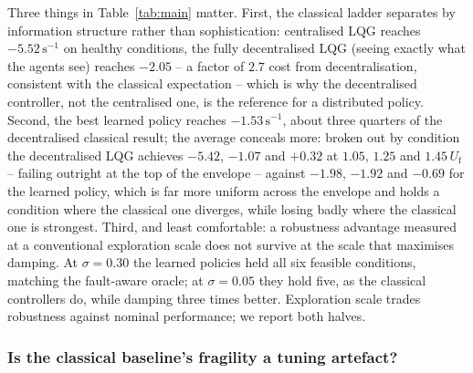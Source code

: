 \documentclass[journal]{new-aiaa}
\newcommand{\Uf}{U_{\mathrm{f}}}
\begin{document}
Three things in Table~\ref{tab:main} matter. First, the classical ladder
separates by information structure rather than sophistication: centralised
LQG reaches $-5.52\,\mathrm{s}^{-1}$ on healthy conditions, the fully
decentralised LQG (seeing exactly what the agents see) reaches $-2.05$ -- a
factor of $2.7$ cost from decentralisation, consistent with the classical
expectation \cite{siljak1991decentralized,rotkowitz2006characterization}
-- which is why the decentralised controller, not the centralised one, is
the reference for a distributed policy. Second, the best learned policy
reaches $-1.53\,\mathrm{s}^{-1}$, about three quarters of the decentralised
classical result; the average conceals more: broken out by condition the
decentralised LQG achieves $-5.42$, $-1.07$ and $+0.32$ at $1.05$, $1.25$
and $1.45\,\Uf$ -- failing outright at the top of the envelope -- against
$-1.98$, $-1.92$ and $-0.69$ for the learned policy, which is far more
uniform across the envelope and holds a condition where the classical one
diverges, while losing badly where the classical one is strongest. Third,
and least comfortable: a robustness advantage measured at a conventional
exploration scale does not survive at the scale that maximises damping. At
$\sigma=0.30$ the learned policies held all six feasible conditions,
matching the fault-aware oracle; at $\sigma=0.05$ they hold five, as the
classical controllers do, while damping three times better. Exploration
scale trades robustness against nominal performance; we report both
halves.

\subsubsection{Is the classical baseline's fragility a tuning artefact?}
\label{sec:robust-baseline}
\end{document}
